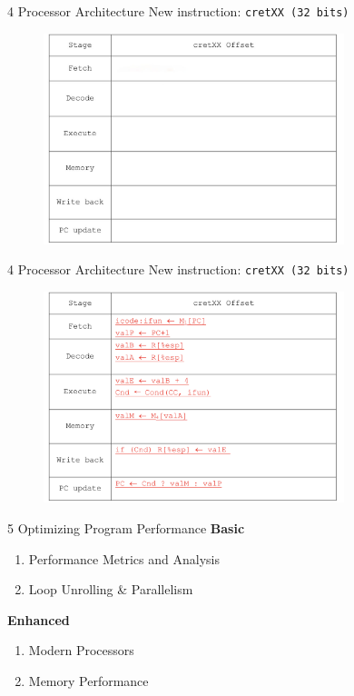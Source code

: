 \documentclass{beamer}
\begin{document}
\begin{frame}{4 Processor Architecture}
	New instruction: \texttt{cretXX  (32 bits)}
	\begin{figure}
		\centering
		\includegraphics[width=0.78\textwidth]{figures/4-1-1.jpeg}
	\end{figure}
\end{frame}

\begin{frame}{4 Processor Architecture}
	New instruction: \texttt{cretXX  (32 bits)}
	\begin{figure}
		\centering
		\includegraphics[width=0.78\textwidth]{figures/4-1-2.jpeg}
	\end{figure}
\end{frame}

\begin{frame}{5 Optimizing Program Performance}
\textbf{Basic}
\begin{enumerate}
	\item Performance Metrics and Analysis
	\item Loop Unrolling \& Parallelism
\end{enumerate}
\textbf{Enhanced}
\begin{enumerate}
	\item Modern Processors
	\item Memory Performance
\end{enumerate}
\end{frame}
\end{document}
